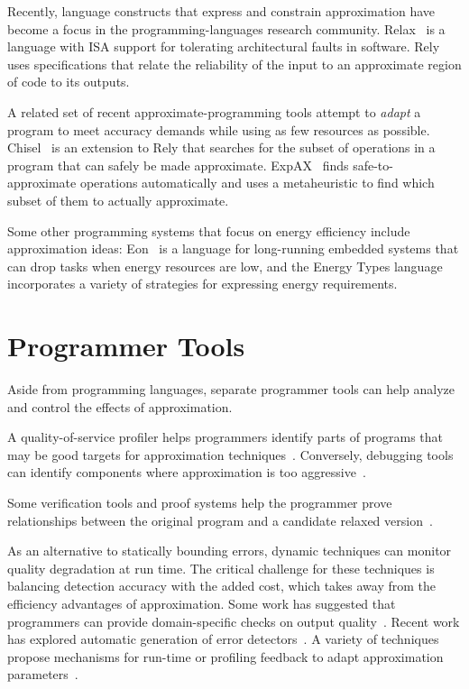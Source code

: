 Recently, language constructs that express and constrain
approximation have become a focus in the programming-languages research
community.
Relax~\cite{relax} is a language with ISA support for tolerating architectural
faults in software.
Rely~\cite{rely} uses specifications that relate the reliability of the input
to an approximate region of code to its outputs.

A related set of recent approximate-programming tools attempt to \emph{adapt}
a program to meet accuracy demands while using as few resources as possible.
Chisel~\cite{chisel} is an extension to Rely that searches for the subset of
operations in a program that can safely be made approximate.
ExpAX~\cite{expax-tr} finds safe-to-approximate operations automatically and
uses a metaheuristic to find which subset of them to actually approximate.

Some other programming systems that focus on energy efficiency include
approximation ideas:
Eon~\cite{eon} is a language for long-running embedded systems that can drop
tasks when energy resources are low,
and the Energy Types language~\cite{energytypes} incorporates a variety of
strategies for expressing energy requirements.


\section{Programmer Tools}

Aside from programming languages, separate programmer tools can help analyze
and control the effects of approximation.

A quality-of-service profiler helps programmers identify parts of programs
that may be good targets for approximation techniques~\cite{qosprof}.
Conversely, debugging tools can identify components where approximation is too
aggressive~\cite{approxdebug}.

Some verification tools and proof systems help
the programmer prove relationships between the original program and a
candidate relaxed version~\cite{carbin-pldi, carbin-races, carbin-pepm,
rice-transformation-semantics}.

As an alternative to statically bounding errors, dynamic techniques can
monitor quality degradation at run time.
The critical challenge for these techniques is balancing detection accuracy
with the added cost, which takes away from the efficiency advantages of
approximation.
Some work has suggested that programmers can provide domain-specific checks on
output quality~\cite{lwc, approxdebug}.
Recent work has explored automatic generation of error detectors~\cite{rumba}.
A variety of techniques propose mechanisms for run-time or profiling feedback to adapt
approximation parameters~\cite{dynamicknobs, green, approxit, ansel-autotuning}.


